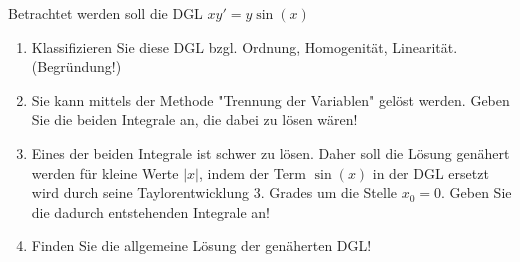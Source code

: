 \item Betrachtet werden soll die DGL $xy' = y\sin(x)$
\begin{enumerate}
\item Klassifizieren Sie diese DGL bzgl. Ordnung, Homogenität, Linearität. (Begründung!)
\item Sie kann mittels der Methode "Trennung der Variablen" gelöst werden. Geben Sie die beiden Integrale an, die dabei zu lösen wären!
\item Eines der beiden Integrale ist schwer zu lösen. Daher soll die Lösung genähert werden für kleine Werte $|x|$, indem der Term $\sin(x)$ in der DGL ersetzt wird durch seine Taylorentwicklung 3. Grades um die Stelle $x_0=0$. Geben Sie die dadurch entstehenden Integrale an!
\item Finden Sie die allgemeine Lösung der genäherten DGL!
\end{enumerate}

